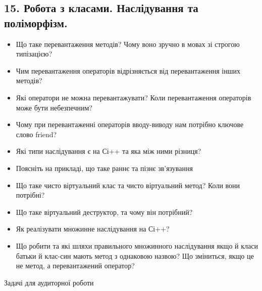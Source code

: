 \documentclass[]{article}
\date{}
\begin{document}
\newpage
\subsection{15. Робота з класами. Наслідування та поліморфізм.}
\setcounter{subsection}{1}


\begin{itemize}
\item
  Що таке перевантаження методів? Чому воно зручно в мовах зі строгою
  типізацією?
\item
  Чим перевантаження операторів відрізняється від перевантаження інших
  методів?
\item
  Які оператори не можна перевантажувати? Коли перевантаження операторів
  може бути небезпечним?
\item
  Чому при перевантаженні операторів вводу-виводу нам потрібно ключове
  слово friend?
\item
  Які типи наслідування є на Сі++ та яка між ними різниця?
\item
  Поясніть на прикладі, що таке раннє та пізнє зв'язування
\item
  Що таке чисто віртуальний клас та чисто віртуальний метод? Коли вони
  потрібні?
\item
  Що таке віртуальний деструктор, та чому він потрібний?
\item
  Як реалізувати множинне наслідування на Сі++?
\item
  Що робити та які шляхи правильного множинного наслідування якщо й
  класи батьки й клас-син мають метод з однаковою назвою? Що зміниться,
  якщо це не метод, а перевантажений оператор?
\end{itemize}

Задачі для аудиторної роботи
\end{document}
